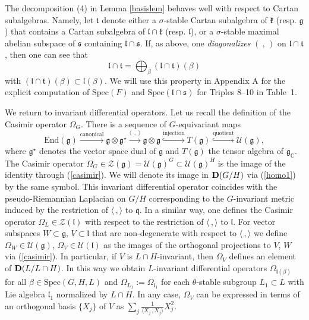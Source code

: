 \documentclass[10]{amsart}
\theoremstyle{remark}
\theoremstyle{definition}
\numberwithin{equation}{section}
\newcommand{\End}{\text{End}}
\newcommand{\fg}{{\mathfrak g}}
\newcommand{\fk}{{\mathfrak k}}
\newcommand{\fl}{{\mathfrak l}}
\newcommand{\fq}{{\mathfrak q}}
\newcommand{\Cal}{\mathcal}
\newcommand{\IP}[2]{\langle#1\,, #2\rangle}     %
\begin{document}
{The decomposition (4) in Lemma \ref{basislem} behaves well with respect to Cartan subalgebras. Namely, let ${\mathfrak t}$ denote either a $\sigma$-stable Cartan subalgebra of ${\mathfrak k}$ (resp. ${\mathfrak g}$) that contains a Cartan subalgebra of ${\mathfrak l}\cap{\mathfrak k}$ (resp. ${\mathfrak l}$), or a $\sigma$-stable maximal abelian subspace of ${\mathfrak s}$ containing ${\mathfrak l}\cap{\mathfrak s}$. If, as above, one {\it diagonalizes} $(\ ,\,)$ on ${\mathfrak l}\cap{\mathfrak t}$, then one can see that
%
\begin{equation}\label{cartanprinciple}
{\mathfrak l}\cap{\mathfrak t}=\bigoplus_\beta({\mathfrak l}\cap{\mathfrak t})(\beta)
\end{equation}
%
with $({\mathfrak l}\cap{\mathfrak t})(\beta)\subset{\mathfrak l}(\beta)$. We will use this property in Appendix A for the explicit computation of $\text{Spec}(F)$ and $\text{Spec}({\mathfrak l}\cap{\mathfrak s})$ for Triples 8--10 in Table~1.
%

We return to invariant differential operators. Let us recall the definition of the Casimir operator $\Omega_G$. There is a sequence of $G$-equivariant maps
%
\begin{equation}\label{casimir}
\End(\fg)\stackrel{\text{canonical}}\longrightarrow\fg\otimes\fg^{\star}\stackrel{\IP{\;}{\;}}\longrightarrow\fg\otimes\fg
\stackrel{\text{injection}}\hookrightarrow T(\fg)\stackrel{\text{quotient}}\hookrightarrow {\Cal U}(\fg),
\end{equation}
%
where $\fg^\star$ denotes the vector space dual of $\fg$ and $T(\fg)$ the tensor algebra of $\fg_{\mathbb C}$. The Casimir operator $\Omega_{G}\in{\Cal Z}(\fg)={\Cal U}(\fg)^G\subset {\Cal U}(\fg)^H$ is the image of the identity through (\ref{casimir}). We will denote its image in ${\bf D}(G/H)$ via (\ref{homo1}) by the same symbol. 
This invariant differential operator
coincides with the pseudo-Riemannian Laplacian on $G/H$ corresponding to the $G$-invariant metric induced by the restriction of $\IP{}{}$ to $\fq$. 
In a similar way, one defines the Casimir 
operator $\Omega_{L}\in {\Cal Z}(\fl)$ 
with respect to the restriction of $\IP{}{}$ to $\fl$. 
For vector subspaces $W\subset\fg$, $V\subset \fl$ that are non-degenerate with respect to $\IP{}{}$ we define $\Omega_W\in{\Cal U}(\fg)$, $\Omega_V\in{\Cal U}(\fl)$
as the images of the orthogonal projections to $V$, $W$ via (\ref{casimir}). In particular, if $V$ is $L\cap H$-invariant, then $\Omega_V$ defines an element of ${\bf D}(L/L\cap H)$.
In this way we obtain $L$-invariant differential operators $\Omega_{\fl(\beta)}$ for all $\beta\in \mathrm{Spec}(G,H,L)$ and $\Omega_{L_1}:=\Omega_{\fl_1}$ for each $\theta$-stable
subgroup $L_1\subset L$ with Lie algebra $\fl_1$ normalized by $L\cap H$.
In any case, $\Omega_V$ can be expressed in terms of an orthogonal basis $\{X_j\}$ of $V$ as $\sum_{j}\frac{1}{\IP{X_{j}}{X_{j}}}X_{j}^{2}$.


}
\end{document}
